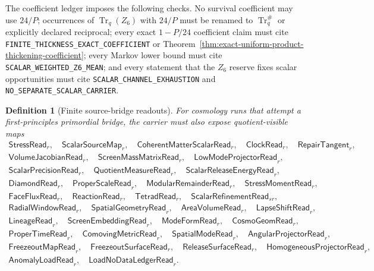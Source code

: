 \documentclass[11pt]{article}
\newtheorem{definition}[theorem]{Definition}
\theoremstyle{remark}
\theoremstyle{plain}
\begin{document}
The coefficient ledger imposes the following checks. No survival coefficient may use
\(24/P\); occurrences of \(\operatorname{Tr}_q(Z_6)\) with \(24/P\) must be
renamed to \(\operatorname{Tr}^{\#}_q\) or explicitly declared reciprocal;
every exact \(1-P/24\) coefficient claim must cite
\texttt{FINITE\_THICKNESS\_EXACT\_COEFFICIENT} or
Theorem~\ref{thm:exact-uniform-product-thickening-coefficient}; every Markov
lower bound must cite \texttt{SCALAR\_WEIGHTED\_Z6\_MEAN}; and every statement
that the \(Z_6\) reserve fixes scalar opportunities must cite
\texttt{SCALAR\_CHANNEL\_EXHAUSTION} and
\texttt{NO\_SEPARATE\_SCALAR\_CARRIER}.

\begin{definition}[Finite source-bridge readouts]\label{def:finite-source-bridge-readouts}
For cosmology runs that attempt a first-principles primordial bridge, the carrier must also expose
quotient-visible maps
\[
\begin{gathered}
\mathsf{StressRead}_r,\quad
\mathsf{ScalarSourceMap}_r,\quad
\mathsf{CoherentMatterScalarRead}_r,\quad
\mathsf{ClockRead}_r,\quad
\mathsf{RepairTangent}_r,\\
\mathsf{VolumeJacobianRead}_r,\quad
\mathsf{ScreenMassMatrixRead}_r,\quad
\mathsf{LowModeProjectorRead}_r,\\
\mathsf{ScalarPrecisionRead}_r,\quad
\mathsf{QuotientMeasureRead}_r,\quad
\mathsf{ScalarReleaseEnergyRead}_r,\\
\mathsf{DiamondRead}_r,\quad
\mathsf{ProperScaleRead}_r,\quad
\mathsf{ModularRemainderRead}_r,\quad
\mathsf{StressMomentRead}_r,\\
\mathsf{FaceFluxRead}_r,\quad
\mathsf{ReactionRead}_r,\quad
\mathsf{TetradRead}_r,\quad
\mathsf{ScalarRefinementRead}_{sr},\\
\mathsf{RadialWindowRead}_r,\quad
\mathsf{SpatialGeometryRead}_r,\quad
\mathsf{AreaVolumeRead}_r,\quad
\mathsf{LapseShiftRead}_r,\\
\mathsf{LineageRead}_r,\quad
\mathsf{ScreenEmbeddingRead}_r,\quad
\mathsf{ModeFormRead}_r,\quad
\mathsf{CosmoGeomRead}_r,\\
\mathsf{ProperTimeRead}_r,\quad
\mathsf{ComovingMetricRead}_r,\quad
\mathsf{SpatialModeRead}_r,\quad
\mathsf{AngularProjectorRead}_r,\\
\mathsf{FreezeoutMapRead}_r,\quad
\mathsf{FreezeoutSurfaceRead}_r,\quad
\mathsf{ReleaseSurfaceRead}_r,\quad
\mathsf{HomogeneousProjectorRead}_r,\\
\mathsf{AnomalyLoadRead}_r,\quad
\mathsf{LoadNoDataLedgerRead}_r .
\end{gathered}
\]
\end{definition}
\end{document}
